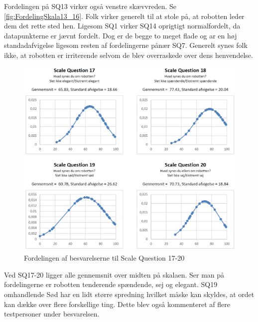 \noindent
%
Fordelingen på SQ13 virker også venstre skævvreden. Se \autoref{fig:FordelingSkala13_16}. Folk virker generelt til at stole på, at robotten leder dem det rette sted hen. Ligesom SQ1 virker SQ14 oprigtigt normalfordelt, da datapunkterne er jævnt fordelt. Dog er de begge to meget flade og ar en høj standadafvigelse ligesom resten af fordelingerne pånær SQ7. Generelt synes folk ikke, at robotten er irriterende selvom de blev overraskede over dens henvendelse. 
%
\begin{figure}[H]
\centering
\includegraphics[width =\textwidth]{Figure/DatabehandlingSkalaer/FordelingSkala17_20} 
\caption{Fordelingen af besvarelserne til Scale Question 17-20}
\label{fig:FordelingSkala17_20}
\end{figure}
\noindent
%
Ved SQ17-20 ligger alle gennemsnit over midten på skalaen. Ser man på fordelingerne er robotten tenderende spændende, sej og elegant. SQ19 omhandlende Sød har en lidt større spredning hvilket måske kan skyldes, at ordet kan dække over flere forskellige ting. Dette blev også kommenteret af flere testpersoner under besvarelsen. 
%
